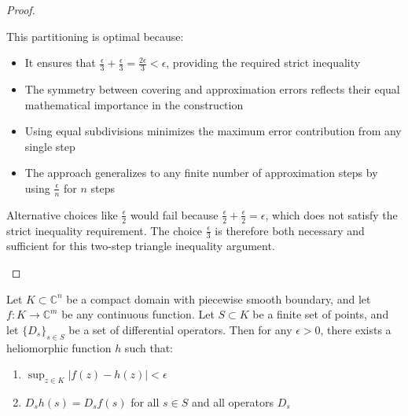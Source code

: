 \begin{proof}
\begin{remark}
This partitioning is optimal because:
\begin{itemize}
    \item It ensures that $\frac{\epsilon}{3} + \frac{\epsilon}{3} = \frac{2\epsilon}{3} < \epsilon$, providing the required strict inequality
    \item The symmetry between covering and approximation errors reflects their equal mathematical importance in the construction
    \item Using equal subdivisions minimizes the maximum error contribution from any single step
    \item The approach generalizes to any finite number of approximation steps by using $\frac{\epsilon}{n}$ for $n$ steps
\end{itemize}

Alternative choices like $\frac{\epsilon}{2}$ would fail because $\frac{\epsilon}{2} + \frac{\epsilon}{2} = \epsilon$, which does not satisfy the strict inequality requirement. The choice $\frac{\epsilon}{3}$ is therefore both necessary and sufficient for this two-step triangle inequality argument.
\end{remark}
\end{proof}

\begin{theorem}
Let $K \subset \mathbb{C}^n$ be a compact domain with piecewise smooth boundary, and let $f: K \rightarrow \mathbb{C}^m$ be any continuous function. Let $S \subset K$ be a finite set of points, and let $\{D_s\}_{s \in S}$ be a set of differential operators. Then for any $\epsilon > 0$, there exists a heliomorphic function $h$ such that:
\begin{enumerate}
    \item $\sup_{z \in K} |f(z) - h(z)| < \epsilon$
    \item $D_sh(s) = D_sf(s)$ for all $s \in S$ and all operators $D_s$
\end{enumerate}
\end{theorem}

